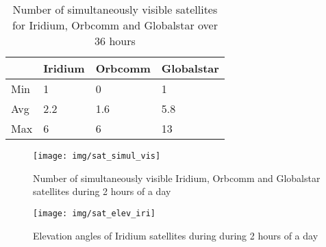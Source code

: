 \begin{table}
    \centering
    \begin{tabular}{llll}
 & Iridium & Orbcomm & Globalstar \\ \hline
Min & 1 & 0 & 1 \\
Avg & 2.2 & 1.6 & 5.8 \\
Max & 6 & 6 & 13 \\
    \end{tabular}
    \caption{Number of simultaneously visible satellites for Iridium, Orbcomm and Globalstar over 36 hours}
    \label{t_sat_simul_vis}
\end{table}

\begin{figure}
    \centering
    \texttt{[image: img/sat\_simul\_vis]}
    \caption{Number of simultaneously visible Iridium, Orbcomm and Globalstar satellites during 2 hours of a day}
    \label{f_sat_simul_vis}
\end{figure}

\begin{figure}
    \centering
    \texttt{[image: img/sat\_elev\_iri]}
    \caption{Elevation angles of Iridium satellites during during 2 hours of a day}
    \label{f_sat_elev_iri}
\end{figure}
